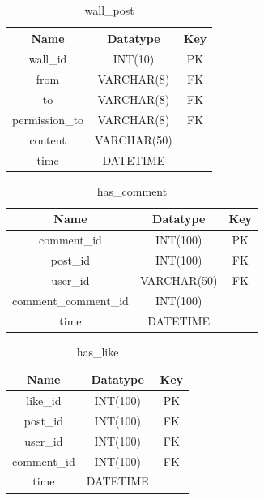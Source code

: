 \begin{table}[!ht]
\caption{wall\_post}
\centering
\begin{tabular}{c c c}
\hline\hline
Name                    & Datatype    & Key \\
\hline
wall\_id                & INT(10)     & PK  \\
from                    & VARCHAR(8)  & FK  \\
to                      & VARCHAR(8)  & FK  \\
permission\_to          & VARCHAR(8)  & FK  \\
content                 & VARCHAR(50) &     \\
time                    & DATETIME    &     \\
\hline
\end{tabular}
\label{table:nonlin}
\end{table}

\begin{table}[!ht]
\caption{has\_comment}
\centering
\begin{tabular}{c c c}
\hline\hline
Name                 & Datatype     & Key \\
\hline
comment\_id          & INT(100)     & PK  \\
post\_id             & INT(100)     & FK  \\
user\_id             & VARCHAR(50)  & FK  \\
comment\_comment\_id & INT(100)     &     \\
time                 & DATETIME     &     \\
\hline
\end{tabular}
\label{table:nonlin}
\end{table}

\begin{table}[!ht]
\caption{has\_like}
\centering
\begin{tabular}{c c c}
\hline\hline
Name               & Datatype    & Key \\
\hline
like\_id           & INT(100)     & PK  \\
post\_id           & INT(100)     & FK  \\
user\_id           & INT(100)     & FK  \\
comment\_id        & INT(100)     & FK  \\
time               & DATETIME     &     \\
\hline
\end{tabular}
\label{table:nonlin}
\end{table}

